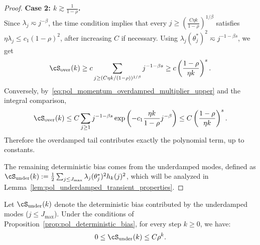 \documentclass[11pt]{article}
\begin{document}
\begin{proof}
\textbf{Case 2: $k \gtrsim \frac{1}{1-\rho}$.} \\
Since $\lambda_j\eqsim j^{-\beta}$, the time condition implies that every
$j\ge \left(\frac{C\eta k}{1-\rho}\right)^{1/\beta}$
satisfies $\eta\lambda_j\le c_1(1-\rho)^2$, after increasing $C$ if necessary.
Using $\lambda_j(\theta_j^*)^2\eqsim j^{-1-\beta s}$, we get
\begin{equation}
\label{eq:pol_momentum_poly_lower}
    \cS_{\mathrm{over}}(k)
    \ge
    c\sum_{j\ge (C\eta k/(1-\rho))^{1/\beta}}j^{-1-\beta s}
    \ge
    c\left(\frac{1-\rho}{\eta k}\right)^s .
\end{equation}
Conversely, by~\eqref{eq:pol_momentum_overdamped_multiplier_upper} and the integral comparison,
\begin{equation*}
    \cS_{\mathrm{over}}(k)
    \le
    C\sum_{j\ge1}j^{-1-\beta s}
    \exp\left(-c_1\frac{\eta k}{1-\rho}j^{-\beta}\right)
    \le
    C\left(\frac{1-\rho}{\eta k}\right)^s .
\end{equation*}
Therefore the overdamped tail contributes exactly the polynomial term, up to constants. 

The remaining deterministic bias comes from the underdamped modes, defined as $\cS_{\mathrm{under}}(k) := \frac{1}{2} \sum_{j \le J_{\max}} \lambda_j (\theta_j^*)^2 h_k(j)^2$, which will be analyzed in Lemma~\ref{lem:pol_underdamped_transient_properties}.
\end{proof}


\begin{lemma}
\label{lem:pol_underdamped_transient_properties}
Let $\cS_{\mathrm{under}}(k)$ denote the deterministic bias contributed by the underdamped modes ($j \le J_{\max}$). Under the conditions of Proposition~\ref{prop:pol_deterministic_bias}, for every step $k \ge 0$, we have:
\begin{equation*}
    0 \le \cS_{\mathrm{under}}(k) \le C \rho^k.
\end{equation*}
\end{lemma}
\end{document}
